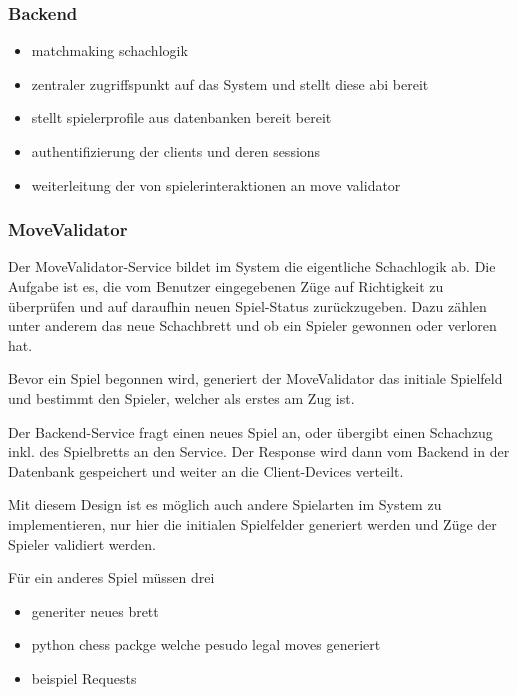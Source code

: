 \hypertarget{backend}{%
\subsubsection{Backend}\label{backend}}

\begin{itemize}
\tightlist
\item
  matchmaking schachlogik
\item
  zentraler zugriffspunkt auf das System und stellt diese abi bereit
\item
  stellt spielerprofile aus datenbanken bereit bereit
\item
  authentifizierung der clients und deren sessions
\item
  weiterleitung der von spielerinteraktionen an move validator
\end{itemize}

\hypertarget{movevalidator}{%
\subsubsection{MoveValidator}\label{movevalidator}}

Der MoveValidator-Service bildet im System die eigentliche Schachlogik
ab. Die Aufgabe ist es, die vom Benutzer eingegebenen Züge auf
Richtigkeit zu überprüfen und auf daraufhin neuen Spiel-Status
zurückzugeben. Dazu zählen unter anderem das neue Schachbrett und ob ein
Spieler gewonnen oder verloren hat.

Bevor ein Spiel begonnen wird, generiert der MoveValidator das initiale
Spielfeld und bestimmt den Spieler, welcher als erstes am Zug ist.

Der Backend-Service fragt einen neues Spiel an, oder übergibt einen
Schachzug inkl. des Spielbretts an den Service. Der Response wird dann
vom Backend in der Datenbank gespeichert und weiter an die
Client-Devices verteilt.

Mit diesem Design ist es möglich auch andere Spielarten im System zu
implementieren, nur hier die initialen Spielfelder generiert werden und
Züge der Spieler validiert werden.

Für ein anderes Spiel müssen drei

\begin{itemize}
\tightlist
\item
  generiter neues brett
\item
  python chess packge welche pesudo legal moves generiert
\item
  beispiel Requests
\end{itemize}

